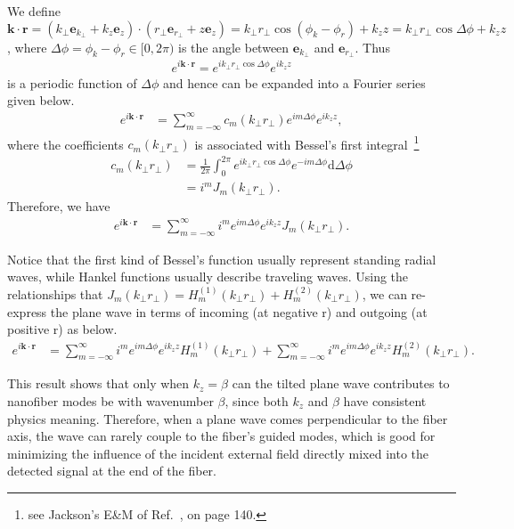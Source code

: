 We define $ \mathbf{k}\cdot\mathbf{r}=(k\!_{\perp}\mathbf{e}\!_{k\!_\perp}+k_z\mathbf{e}_{z}) \cdot(r\!_{\perp}\mathbf{e}\!_{r\!_\perp}+z\mathbf{e}_{z}) = k\!_{\perp}r\!_{\perp}\cos(\phi_{k}-\phi_{r})+k_{z}{z}= k\!_\perp r\!_\perp \cos \Delta\phi +k_{z}{z}$, where $ \Delta\phi=\phi_{k}-\phi_{r} \in [0,2\pi)$ is the angle between $ \mathbf{e}_{k\!_\perp} $ and $ \mathbf{e}_{r\!_\perp} $. Thus
\begin{align}
e^{i\mathbf{k}\cdot \mathbf{r}}=e^{ik\!_\perp r\!_\perp\cos\Delta\phi}e^{ik_{z}{z}}
\end{align}
is a periodic function of $ \Delta\phi $ and hence can be expanded into a Fourier series given below. 
\begin{align}
e^{i\mathbf{k}\cdot \mathbf{r}} &= \sum_{m=-\infty}^{\infty}c_{m}(k\!_\perp r\!_\perp)e^{im\Delta\phi}e^{ik_{z}{z}},
\end{align}
where the coefficients $ c_{m}(k\!_\perp r\!_\perp) $ is associated with Bessel's first integral~\footnote{see Jackson's E\&M of Ref.~\cite{Jackson1975}, on page 140.}
\begin{align}
c_{m}(k\!_\perp r\!_\perp)&= \frac{1}{2\pi} \int_0^{2\pi} e^{ik\!_\perp r\!_\perp\cos \Delta\phi}e^{-im\Delta\phi}\mathrm{d}\Delta\phi\\
&=i^mJ_m(k\!_\perp r\!_\perp).
\end{align}
Therefore, we have
\begin{align}
e^{i\mathbf{k}\cdot \mathbf{r}} &=\sum_{m=-\infty}^{\infty}i^me^{im\Delta\phi}e^{ik_{z}{z}}J_m(k\!_\perp r\!_\perp).
\end{align}

Notice that the first kind of Bessel's function usually represent standing radial waves, while Hankel functions usually describe traveling waves. Using the relationships that $ J_{m}(k\!_\perp r\!_\perp)=H_{m}^{(1)}(k\!_\perp r\!_\perp)+H_{m}^{(2)}(k\!_\perp r\!_\perp) $, we can re-express the plane wave in terms of incoming (at negative r) and outgoing (at positive r) as below.
\begin{align}
e^{i\mathbf{k}\cdot \mathbf{r}} &=\sum_{m=-\infty}^{\infty}i^me^{im\Delta\phi}e^{ik_{z}{z}} H_{m}^{(1)}(k\!_\perp r\!_\perp)+\sum_{m=-\infty}^{\infty}i^me^{im\Delta\phi}e^{ik_{z}{z}} H_{m}^{(2)}(k\!_\perp r\!_\perp).
\end{align}

This result shows that only when $ k_z=\beta $ can the tilted plane wave contributes to nanofiber modes be with wavenumber $ \beta $, since both $ k_z $ and $ \beta $ have consistent physics meaning. Therefore, when a plane wave comes perpendicular to the fiber axis, the wave can rarely couple to the fiber's guided modes, which is good for minimizing the influence of the incident external field directly mixed into the detected signal at the end of the fiber. 
